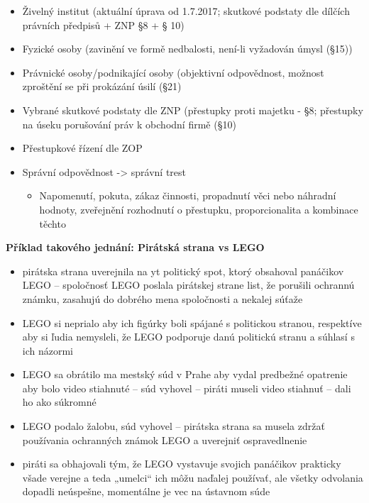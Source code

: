 \begin{itemize}
    \item Živelný institut (aktuální úprava od 1.7.2017; skutkové podstaty dle dílčích právních předpisů + ZNP §8
    + § 10)
    \item Fyzické osoby (zavinění ve formě nedbalosti, není-li vyžadován úmysl (§15))
    \item Právnické osoby/podnikající osoby (objektivní odpovědnost, možnost zproštění se při prokázání úsilí
    (§21)
    \item Vybrané skutkové podstaty dle ZNP (přestupky proti majetku - §8; přestupky na úseku porušování práv
    k obchodní firmě (§10)
    \item Přestupkové řízení dle ZOP
    \item Správní odpovědnost -> správní trest
    \begin{itemize}
        \item Napomenutí, pokuta, zákaz činnosti, propadnutí věci nebo náhradní hodnoty, zveřejnění
rozhodnutí o přestupku, proporcionalita a kombinace těchto
    \end{itemize}
\end{itemize}
\textbf{Příklad takového jednání: Pirátská strana vs LEGO}
\begin{itemize}
    \item pirátska strana uverejnila na yt politický spot, ktorý obsahoval panáčikov
    LEGO – spoločnosť LEGO poslala pirátskej strane list, že porušili ochrannú
    známku, zasahujú do dobrého mena spoločnosti a nekalej súťaže
    \item  LEGO si neprialo aby ich figúrky boli spájané s politickou stranou,
    respektíve aby si ľudia nemysleli, že LEGO podporuje danú politickú stranu
    a súhlasí s ich názormi
    \item  LEGO sa obrátilo ma mestský súd v Prahe aby vydal predbežné opatrenie
    aby bolo video stiahnuté – súd vyhovel – piráti museli video stiahnuť – dali
    ho ako súkromné
    \item  LEGO podalo žalobu, súd vyhovel – pirátska strana sa musela zdržať
    používania ochranných známok LEGO a uverejniť ospravedlnenie
    \item  piráti sa obhajovali tým, že LEGO vystavuje svojich panáčikov prakticky
    všade verejne a teda „umelci“ ich môžu naďalej používať, ale všetky
    odvolania dopadli neúspešne, momentálne je vec na ústavnom súde

\end{itemize}

